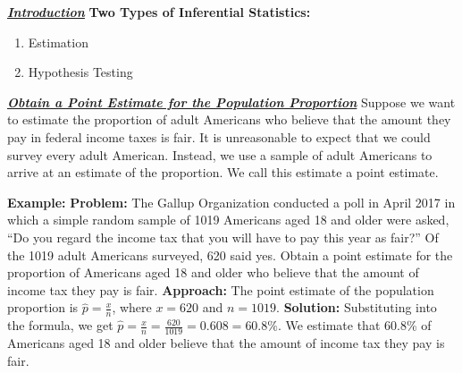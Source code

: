 \documentclass{report}
\begin{document}
    \pagebreak \bigbreak \noindent 
    \textbf{\textit{\underline{Introduction}}}
    \bigbreak \noindent 
    \textbf{Two Types of Inferential Statistics:}
    \begin{enumerate}
        \item Estimation
        \item Hypothesis Testing
    \end{enumerate}

    \bigbreak \noindent \bigbreak \noindent 
    \textbf{\textit{\underline{Obtain a Point Estimate for the Population Proportion}}}
    \bigbreak \noindent 
    Suppose we want to estimate the proportion of adult Americans who believe that the amount they pay in federal income taxes is fair. It is unreasonable to expect that we could survey every adult American. Instead, we use a sample of adult Americans to arrive at an estimate of the proportion. We call this estimate a point estimate.
    \bigbreak \noindent 
    \begin{mdframed}
      \textbf{Example: }
      \bigbreak \noindent 
      \textbf{Problem:}
      \bigbreak \noindent 
      The Gallup Organization conducted a poll in April 2017 in which a simple random sample of 1019 Americans aged 18 and older were asked, “Do you regard the income tax that you will have to pay this year as fair?” Of the 1019 adult Americans surveyed, 620 said yes. Obtain a point estimate for the proportion of Americans aged 18 and older who believe that the amount of income tax they pay is fair.
      \bigbreak \noindent 
      \textbf{Approach:}
      The point estimate of the population proportion is $\hat{p}=\frac{x}{n}$, where $x=620$ and $n=1019$.
      \bigbreak \noindent 
      \textbf{Solution:}
      \bigbreak \noindent 
      Substituting into the formula, we get $\hat{p}=\frac{x}{n}=\frac{620}{1019}=0.608=60.8\%$.
      \bigbreak \noindent 
        We estimate that 60.8\% of Americans aged 18 and older believe that the amount of income tax they pay is fair.
    \end{mdframed}
\end{document}
